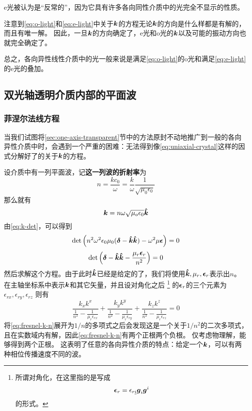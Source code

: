 \documentclass[UTF8, a4paper]{ctexart}
\begin{document}
e光被认为是“反常的”，因为它具有许多各向同性介质中的光完全不显示的性质。

注意到\eqref{eq:o-light}和\eqref{eq:e-light}中关于$\vb*{k}$的方程无论$\vb*{k}$的方向是什么样都是有解的，而且有唯一解。
因此，一旦$\vb*{k}$的方向确定了，e光和o光的$\vb*{k}$以及可能的振动方向也就完全确定了。

总之，各向异性线性介质中的光一般来说是满足\eqref{eq:o-light}的o光和满足\eqref{eq:e-light}的e光的叠加。

\subsection{双光轴透明介质内部的平面波}

\subsubsection{菲涅尔法线方程}

当我们试图将\ref{sec:one-axis-transparent}节中的方法原封不动地推广到一般的各向异性介质中时，会遇到一个严重的困难：无法得到像\eqref{eq:uniaxial-crystal}这样的因式分解好了的关于$\vb*{k}$的方程。

设介质中有一列平面波，记\textbf{这一列波的折射率}为
\begin{equation}
    n = \frac{k c_0}{\omega} = \frac{k}{\omega} \frac{1}{\sqrt{\mu_0 \epsilon_0}}
\end{equation}
那么就有
\[
    \vb*{k} = n \omega \sqrt{\mu_o \epsilon_0} \vu*{k}
\]
由\eqref{eq:k-det}，可以得到
\[
    \det \left( n^2 \omega^2 \epsilon_0 \mu_0 (\vb*{\delta} - \vu*{k} \vu*{k}) - \omega^2 \mu \vb*{\epsilon} \right) = 0
\]
\[
    \det \left( \vb*{\delta} - \vu*{k} \vu*{k} - \frac{\mu_r \vb*{\epsilon}_r}{n^2} \right) = 0
\]
然后求解这个方程。由于此时$\vu*{k}$已经是给定的了，我们将使用$\vu*{k}, \mu_r, \vb*{\epsilon}_r$表示出$n$。
在主轴坐标系中表示$\vb*{k}$和其它矢量，并且设对角化之后%
\footnote{
    所谓对角化，在这里指的是写成
    \[
        \vb*{\epsilon}_r = \epsilon_{r \underline{i}} \vb*{g}_i \vb*{g}^i
    \]
    的形式。
}%
的$\vb*{\epsilon}_r$的三个元素为$\epsilon_{rx}, \epsilon_{ry}, \epsilon_{rz}$
则有
\begin{equation}
    \frac{k_x k^x}{\frac{1}{n^2} - \frac{1}{\mu_r \epsilon_{rx}}} + \frac{k_y k^y}{\frac{1}{n^2} - \frac{1}{\mu_r \epsilon_{ry}}} + \frac{k_z k^z}{\frac{1}{n^2} - \frac{1}{\mu_r \epsilon_{rz}}} = 0
    \label{eq:fresnel-k-n}
\end{equation}
将\eqref{eq:fresnel-k-n}展开为$1/n$的多项式之后会发现这是一个关于$1/n^2$的二次多项式，且在实数域内有解，因此\eqref{eq:fresnel-k-n}有两个正根两个负根。
仅考虑物理解，能够得到两个正根。
这表明了任意的各向异性介质的特点：给定一个$\vb*{k}$，可以有两种相位传播速度不同的波。
\end{document}
